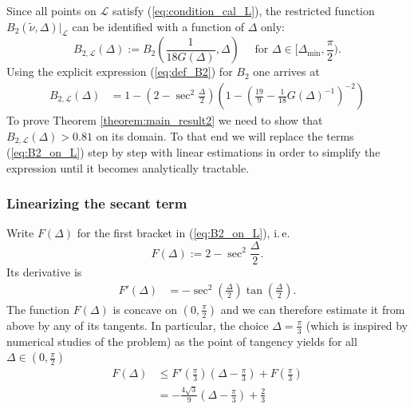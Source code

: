 \documentclass{article}
\newcommand{\ite}{i.\,e.\xspace}
\begin{document}
Since all points on $\mathcal{L}$ satisfy (\ref{eq:condition_cal_L}), the restricted function $B_2(\tilde\nu,\Delta)|_{\mathcal{L}}$ can be identified with a function of $\Delta$ only:
\[B_{2,\mathcal{L}}(\Delta) := B_2(\frac{1}{18G(\Delta)},\Delta) \quad \text{ for }\Delta\in[\Delta_{\text{min}},\frac\pi 2).\]
Using the explicit expression (\ref{eq:def_B2}) for $B_2$ one arrives at
\begin{align}
    B_{2,\mathcal{L}}(\Delta)
    &= 1 -  \left(2 - \sec^2 \frac\Delta 2\right)\left( 1-\left(\frac{19}{9}- \frac 1{18} G(\Delta)^{-1}\right)^{-2}\right) \label{eq:B2_on_L}
\end{align}
To prove Theorem \ref{theorem:main_result2} we need to show that $B_{2,\mathcal{L}}(\Delta) > 0.81$ on its domain. To that end we will replace the terms (\ref{eq:B2_on_L}) step by step with linear estimations in order to simplify the expression until it becomes analytically tractable.

\subsubsection*{Linearizing the secant term}

Write $F(\Delta)$ for the first bracket in (\ref{eq:B2_on_L}), \ite
\[F(\Delta) := 2 - \sec^2 \frac\Delta 2.\]
Its derivative is
\begin{align*}
    F'(\Delta) &= -\sec^2(\frac\Delta 2) \tan(\frac\Delta2).
\end{align*}
The function $F(\Delta)$ is concave on $(0,\frac\pi 2)$ and we can therefore estimate it from above by any of its tangents.
In particular, the choice $\Delta = \frac\pi 3$ (which is inspired by numerical studies of the problem) as the point of tangency yields for all $\Delta \in (0,\frac\pi 2)$ 
\begin{align}
    F(\Delta) &\le F'(\frac\pi 3)(\Delta-\frac\pi 3)+F(\frac\pi 3)\nonumber\\
    &= -\frac{4\sqrt 3}{9}(\Delta-\frac \pi 3) + \frac 23 \label{eq:estimate_F_tangent}
\end{align}
\end{document}
